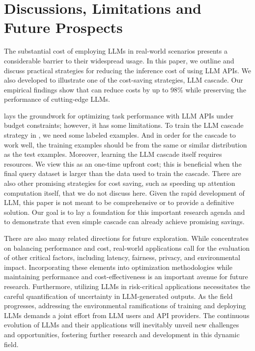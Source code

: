 \documentclass{article}
\begin{document}
\section{Discussions, Limitations and Future Prospects}\label{sec:AML:conclusion}
The substantial cost of employing LLMs in real-world scenarios presents a considerable barrier to their widespread usage. In this paper, we outline and discuss practical strategies for reducing the inference cost of using LLM APIs. We also developed \systemFGPT{} to illustrate one of the cost-saving strategies, LLM cascade.  
Our empirical findings show that \systemFGPT{} can reduce costs by up to 98\% while preserving the performance of cutting-edge LLMs.

\systemFGPT{} lays the groundwork for optimizing task performance with LLM APIs under budget constraints; however, it has some limitations. To train the LLM cascade strategy in \systemFGPT{}, we need some labeled examples. And in order for the cascade to work well, the training examples should be from the same or similar  distribution as the test examples. Moreover, learning the LLM cascade itself requires resources. We view this as an one-time upfront cost; this is beneficial when the final query dataset is larger than the data used to train the cascade. There are also other promising strategies for cost saving, such as speeding up attention computation itself, that we do not discuss here. Given the rapid development of LLM, this paper is not meant to be comprehensive or to provide a definitive solution. Our goal is to lay a foundation for this important research agenda and to demonstrate that even simple cascade can already achieve promising savings. 

There are also many related directions  for future exploration. While \systemFGPT{} concentrates on balancing performance and cost, real-world applications call for the evaluation of other critical factors, including latency, fairness, privacy, and environmental impact. Incorporating these elements into optimization methodologies while maintaining performance and cost-effectiveness is an important avenue for future research. Furthermore, utilizing LLMs in risk-critical applications necessitates the careful quantification of uncertainty in LLM-generated outputs. As the field progresses, addressing the environmental ramifications of training and deploying LLMs demands a joint effort from LLM users and API providers. The continuous evolution of LLMs and their applications will inevitably unveil new challenges and opportunities, fostering further research and development in this dynamic field.

\newpage



%
\end{document}
